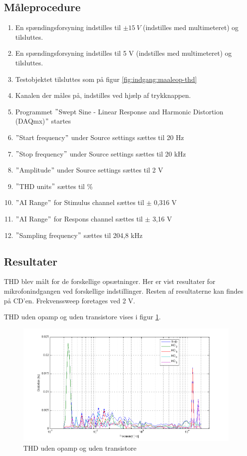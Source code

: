 \subsection*{Måleprocedure}
\begin{enumerate}
\item En spændingsforsyning indstilles til $\pm15~V$ (indstilles med multimeteret) og tilsluttes.
\item En spændingsforsyning indstilles til 5 V (indstilles med multimeteret) og tilsluttes.
\item Testobjektet tilsluttes som på figur \ref{fig:indgang:maaleop-thd}
\item Kanalen der måles på, indstilles ved hjælp af trykknappen.
\item Programmet $"$Swept Sine - Linear Response and Harmonic Distortion (DAQmx)$"$ startes
\item $"$Start frequency$"$ under Source settings sættes til 20 Hz
\item $"$Stop frequency$"$ under Source settings sættes til 20 kHz
\item $"$Amplitude$"$ under Source settings sættes til 2 V
\item $"$THD units$"$ sættes til \%
\item $"$AI Range$"$ for Stimulus channel sættes til $\pm$ 0,316 V
\item $"$AI Range$"$ for Respons channel sættes til $\pm$ 3,16 V
\item $"$Sampling frequency$"$ sættes til 204,8 kHz
\end{enumerate}

\subsection*{Resultater}

THD blev målt for de forskellige opsætninger. Her er vist resultater for mikrofonindgangen ved forskellige indstillinger. Resten af resultaterne kan findes på CD'en. Frekvenssweep foretages ved 2 V.

THD uden opamp og uden transistore vises i figur \ref{fig:apind:uoput}.
\begin{figure}[h]
\centering
\includegraphics[width=\textwidth]{maalerapporter/indgangsvaelger/maalinger/2. gang/ingen opamp 2V uden transistor thd.png}
\caption{THD uden opamp og uden transistore}
\label{fig:apind:uoput}
\end{figure}

